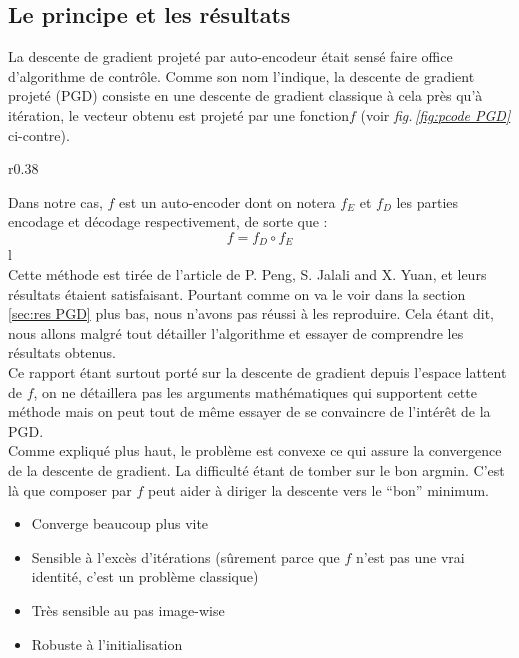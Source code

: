 \documentclass[hidelinks, french]{article} %
\newcommand{\figref}[1]{\textit{fig.\,\ref{#1}}}
\theoremstyle{enonce}
\theoremstyle{special}
\theoremstyle{rq}
\theoremstyle{exo}
\theoremstyle{demo}
\begin{document}
\subsection{Le principe et les résultats}\label{sec:PGD}
\quad 

La descente de gradient projeté par auto-encodeur était sensé faire office d'algorithme de contrôle. Comme son nom l'indique, la descente de gradient projeté (PGD) consiste en une descente de gradient classique à cela près qu'à itération, le vecteur obtenu est projeté par une fonction$f$ (voir \figref{fig:pcode PGD} ci-contre). 

\begin{wrapfigure}[17]{r}{0.38\textwidth}
    
    \caption{Algorithme de PGD}
    \label{fig:pcode PGD}
\end{wrapfigure}
\noindent Dans notre cas, $f$ est un auto-encoder dont on notera $f_E$ et $f_D$ les parties encodage et décodage respectivement, de sorte que :
\[f = f_D\circ f_E\]{\color{white}l}
\\
Cette méthode est tirée de l'article \cite{peng_solving_2019} de P. Peng, S. Jalali and X. Yuan, et leurs résultats étaient satisfaisant. Pourtant comme on va le voir dans la section \ref{sec:res PGD} plus bas, nous n'avons pas réussi à les reproduire.
Cela étant dit, nous allons malgré tout détailler l'algorithme et essayer de comprendre les résultats obtenus.
\\
Ce rapport étant surtout porté sur la descente de gradient depuis l'espace lattent de $f$, on ne détaillera pas les arguments mathématiques qui supportent cette méthode mais on peut tout de même essayer de se convaincre de l'intérêt de la PGD.\\
Comme expliqué plus haut, le problème est convexe ce qui assure la convergence de la descente de gradient. La difficulté étant de tomber sur le bon argmin. C'est là que composer par $f$ peut aider à diriger la descente vers le ``bon'' minimum.


\begin{itemize}
	\item Converge beaucoup plus vite
	\item Sensible à l'excès d'itérations (sûrement parce que $f$ n'est pas une vrai identité, c'est un problème classique)
	\item Très sensible au pas image-wise
	\item Robuste à l'initialisation
\end{itemize}
\end{document}
